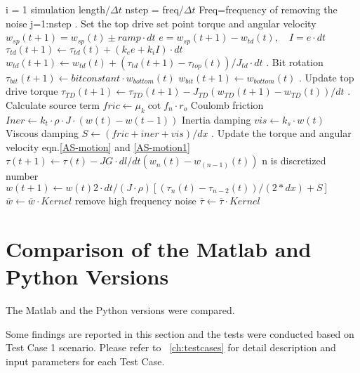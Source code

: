 \newcommand{\codecomment}[1]{\hfill #1}
\pushinitialcodeindent{0in}
\begin{code}[\codenumbering]{}
\codeitemnonumber \pseudocodefor{} i = 1 simulation length/$\Delta t$
	\stepcodelevel{}
	\codeitemnonumber nstep = freq/$\Delta t$ \codecomment{Freq=frequency of removing the noise}
	\codeitemnonumber \pseudocodefor{} {j=1:nstep}
		\stepcodelevel{}
	    . Set the top drive set point torque and angular velocity
	    \codeitemnonumber $w_{sp}(t+1)=w_{sp}(t)\pm ramp \cdot dt$
	    \codeitemnonumber $e=w_{sp}(t+1)-w_{td}(t), \quad I=e \cdot dt$
	    \codeitemnonumber $\tau_{td}(t+1) \gets \tau_{td}(t) + (k_e e + k_i I) \cdot dt$
	    \codeitemnonumber $w_{td}(t+1) \gets w_{td}(t) + (\tau_{td}(t+1)-\tau_{top}(t))/J_{td} \cdot dt$
	    . Bit rotation
	    \codeitemnonumber $\tau_{bit}(t+1) \gets bitconstant \cdot w_{bottom}(t)$
	    \codeitemnonumber $w_{bit}(t+1) \gets w_{bottom}(t)$
	    . Update top drive torque
	    \codeitemnonumber $\tau_{TD}(t+1) \gets \tau_{TD}(t+1)-J_{TD}(w_{TD}(t+1)-w_{TD}(t))/dt$
	    . Calculate source term
	    \codeitemnonumber $fric \gets \mu_k \cot f_n \cdot r_o$ \codecomment{Coulomb friction}
	    \codeitemnonumber $Iner \gets k_t \cdot \rho \cdot J \cdot (w(t)-w(t-1))$ \codecomment{Inertia damping}
	    \codeitemnonumber $vis \gets k_s \cdot w(t)$ \codecomment{Viscous damping}
	    \codeitemnonumber $S \gets (fric+iner+vis)/dx$
	    . Update the torque and angular velocity \codecomment{eqn.\ref{AS-motion} and \ref{AS-motion1}}
	    \codeitemnonumber $\tau(t+1) \gets \tau(t) - JG \cdot dl/dt (w_n(t)-w_{(n-1)}(t))$ \codecomment{n is discretized number}
	    \codeitemnonumber $w(t+1) \gets w(t) 2 \cdot dt/(J \cdot \rho)\left[(\tau_n(t)-\tau_{n-2}(t))/(2*dx)+S\right]$
	    \prevcodelevel{}
	\codeitemnonumber \pseudocodedonefor{}
	\codeitemnonumber $\overline{w} \gets \overline{w} \cdot Kernel$ \codecomment{remove high frequency noise}
	\codeitemnonumber $\overline{\tau} \gets \overline{\tau} \cdot Kernel$
	\prevcodelevel{}
\codeitemnonumber \pseudocodedonefor{}
\end{code}
\popinitialcodeindent{}

\section{Comparison of the Matlab and Python Versions}
The Matlab and the Python versions were compared.

Some findings are reported in this section and the tests were conducted based on Test Case 1 scenario. Please refer to \chaptername~\ref{ch:testcases} for detail description and input parameters for each Test Case.


